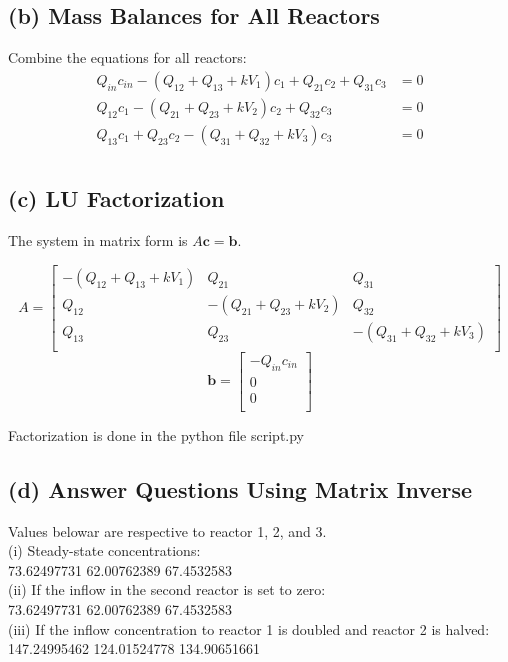 \documentclass{article}
\begin{document}
\subsection*{(b) Mass Balances for All Reactors}
Combine the equations for all reactors:
\[
\begin{aligned}
Q_{in} c_{in} - (Q_{12} + Q_{13} + k V_1) c_1 + Q_{21} c_2 + Q_{31} c_3 &= 0 \\
Q_{12} c_1 - (Q_{21} + Q_{23} + k V_2) c_2 + Q_{32} c_3 &= 0 \\
Q_{13} c_1 + Q_{23} c_2 - (Q_{31} + Q_{32} + k V_3) c_3 &= 0 \\
\end{aligned}
\]

\subsection*{(c) LU Factorization}
The system in matrix form is \( A\mathbf{c} = \mathbf{b} \).

\[
A = \begin{bmatrix}
-(Q_{12} + Q_{13} + k V_1) & Q_{21} & Q_{31} \\
Q_{12} & -(Q_{21} + Q_{23} + k V_2) & Q_{32} \\
Q_{13} & Q_{23} & -(Q_{31} + Q_{32} + k V_3) \\
\end{bmatrix}
\]
\[
\mathbf{b} = \begin{bmatrix}
-Q_{in} c_{in} \\
0 \\
0 \\
\end{bmatrix}
\]

Factorization is done in the python file script.py
\subsection*{(d) Answer Questions Using Matrix Inverse}
Values belowar are respective to reactor 1, 2, and 3.\\
(i) Steady-state concentrations:\\
73.62497731 62.00762389 67.4532583 \\

(ii) If the inflow in the second reactor is set to zero:\\
73.62497731 62.00762389 67.4532583 \\

(iii) If the inflow concentration to reactor 1 is doubled and reactor 2 is halved:\\
147.24995462 124.01524778 134.90651661
\end{document}
